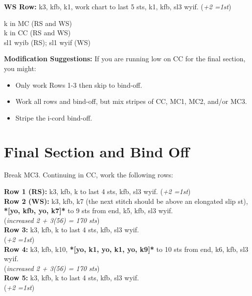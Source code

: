 \documentclass[12pt]{article}
\newcommand{\rowDir}[1]{\textbf{#1:}} %
\renewcommand{\repeat}[1]{\textbf{*[#1]*}} %
\newcommand{\increase}[1]{(\emph{+#1 
	\ifnum#1=1{st}\else{sts}\fi})}
\newenvironment{frnote}
    {%
    	\setlength{\FrameRule}{1.5pt}
    	\def\FrameCommand{\fboxrule=\FrameRule\fboxsep=\FrameSep \fcolorbox{framecolor}{shadecolor}}
    	\MakeFramed {\FrameRestore}}
    {\setlength{\FrameRule}{1pt}
	\endMakeFramed}
\begin{document}
\hspace{2em} \rowDir{WS Row} k3, kfb, k1, work chart to last 5 sts, k1, kfb, sl3 wyif. \increase{2}

\begin{multicols}{2}

\vfill \columnbreak

\begin{addmargin}[8em]{0em} \small
\textknit{-} k in MC (RS and WS) \\ 

\textknit{=} k in CC (RS and WS) \\

 sl1 wyib (RS); sl1 wyif (WS)
\end{addmargin}

\end{multicols}

\newpage

\begin{frnote}
\textbf{Modification Suggestions:} If you are running low on CC for the final section, you might:
\begin{itemize} \small
\item Only work Rows 1-3 then skip to bind-off. 
\item Work all rows and bind-off, but mix stripes of CC, MC1, MC2, and/or MC3. 
\item Stripe the i-cord bind-off. \vspace{-1em}
\end{itemize}
\end{frnote}

\section*{Final Section and Bind Off}

Break MC3. Continuing in CC, work the following rows:

\rowDir{Row 1 (RS)} k3, kfb, k to last 4 sts, kfb, sl3 wyif. \increase{2} \\
\rowDir{Row 2 (WS)} k3, kfb, k7 (the next stitch should be above an elongated slip st), \repeat{yo, kfb, yo, k7} to 9 sts from end, k5, kfb, sl3 wyif. \\ (\emph{increased 2 + 3(56) = 170 sts})\\
\rowDir{Row 3} k3, kfb, k to last 4 sts, kfb, sl3 wyif. \\ \increase{2} \\
\rowDir{Row 4} k3, kfb, k10, \repeat{yo, k1, yo, k1, yo, k9} to 10 sts from end, k6, kfb, sl3 wyif. \\ (\emph{increased 2 + 3(56) = 170 sts}) \\
\rowDir{Row 5} k3, kfb, k to last 4 sts, kfb, sl3 wyif. \\ \increase{2}
\end{document}
